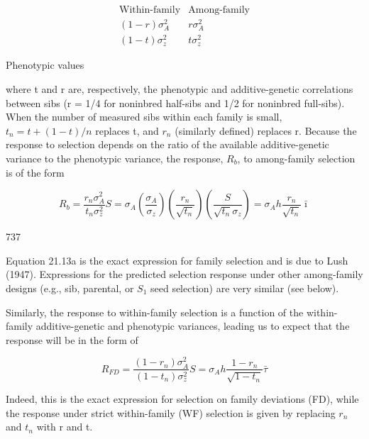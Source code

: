 \documentclass{article}
\begin{document}
\begin{equation}
\begin{array}{ccc} \text{Within-family} & \text{Among-family} \\ \hline (1-r)\sigma_{A}^{2} & r\sigma_{A}^{2} \\ (1-t)\sigma_{z}^{2} & t\sigma_{z}^{2} \end{array}
\end{equation}

Phenotypic values

where t and r are, respectively, the phenotypic and additive-genetic correlations between sibs (r = 1/4 for noninbred half-sibs and 1/2 for noninbred full-sibs). When the number of measured sibs within each family is small,  $ t_n = t + (1 - t)/n $ replaces t, and  $ r_n $ (similarly defined) replaces r. Because the response to selection depends on the ratio of the available additive-genetic variance to the phenotypic variance, the response,  $ R_b $, to among-family selection is of the form

\begin{equation}
R_{b}=\frac{r_{n}\sigma_{A}^{2}}{t_{n}\sigma_{z}^{2}}S=\sigma_{A}\left(\frac{\sigma_{A}}{\sigma_{z}}\right)\left(\frac{r_{n}}{\sqrt{t_{n}}}\right)\left(\frac{S}{\sqrt{t_{n}}\sigma_{z}}\right)=\sigma_{A}h\frac{r_{n}}{\sqrt{t_{n}}}\bar{\imath}
\tag{21.13a}
\label{eq:21_13a}
\end{equation}

737

Equation 21.13a is the exact expression for family selection and is due to Lush (1947). Expressions for the predicted selection response under other among-family designs (e.g., sib, parental, or  $ S_{1} $ seed selection) are very similar (see below).

Similarly, the response to within-family selection is a function of the within-family additive-genetic and phenotypic variances, leading us to expect that the response will be in the form of

\begin{equation}
R_{F D}=\frac{\left(1-r_{n}\right)\sigma_{A}^{2}}{\left(1-t_{n}\right)\sigma_{z}^{2}}S=\sigma_{A}h\frac{1-r_{n}}{\sqrt{1-t_{n}}}\bar{\tau}
\tag{21.13b}
\label{eq:21_13b}
\end{equation}

Indeed, this is the exact expression for selection on family deviations (FD), while the response under strict within-family (WF) selection is given by replacing  $ r_{n} $ and  $ t_{n} $ with r and t.
\end{document}
